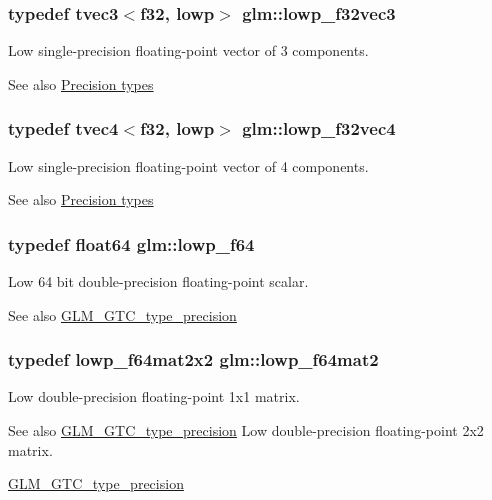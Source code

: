 \subsubsection[{lowp\+\_\+f32vec3}]{\setlength{\rightskip}{0pt plus 5cm}typedef tvec3$<${\bf f32}, lowp$>$ {\bf glm\+::lowp\+\_\+f32vec3}}\label{namespaceglm_a20fd0e645527d92ef2cc90fd9f381b77}
Low single-\/precision floating-\/point vector of 3 components. \begin{DoxySeeAlso}{See also}
\hyperlink{group__core__precision}{Precision types} 
\end{DoxySeeAlso}
\hypertarget{namespaceglm_a4195c4bf218285be96f8ea5dddbb76c0}{}
\subsubsection[{lowp\+\_\+f32vec4}]{\setlength{\rightskip}{0pt plus 5cm}typedef tvec4$<${\bf f32}, lowp$>$ {\bf glm\+::lowp\+\_\+f32vec4}}\label{namespaceglm_a4195c4bf218285be96f8ea5dddbb76c0}
Low single-\/precision floating-\/point vector of 4 components. \begin{DoxySeeAlso}{See also}
\hyperlink{group__core__precision}{Precision types} 
\end{DoxySeeAlso}
\hypertarget{namespaceglm_a59839f4bf6b97c93b0def577890bbfb8}{}
\subsubsection[{lowp\+\_\+f64}]{\setlength{\rightskip}{0pt plus 5cm}typedef {\bf float64} {\bf glm\+::lowp\+\_\+f64}}\label{namespaceglm_a59839f4bf6b97c93b0def577890bbfb8}
Low 64 bit double-\/precision floating-\/point scalar. \begin{DoxySeeAlso}{See also}
\hyperlink{group__gtc__type__precision}{G\+L\+M\+\_\+\+G\+T\+C\+\_\+type\+\_\+precision} 
\end{DoxySeeAlso}
\hypertarget{namespaceglm_a2984b3b0b6ee0657044d186bb875b4e3}{}
\subsubsection[{lowp\+\_\+f64mat2}]{\setlength{\rightskip}{0pt plus 5cm}typedef {\bf lowp\+\_\+f64mat2x2} {\bf glm\+::lowp\+\_\+f64mat2}}\label{namespaceglm_a2984b3b0b6ee0657044d186bb875b4e3}
Low double-\/precision floating-\/point 1x1 matrix. \begin{DoxySeeAlso}{See also}
\hyperlink{group__gtc__type__precision}{G\+L\+M\+\_\+\+G\+T\+C\+\_\+type\+\_\+precision} Low double-\/precision floating-\/point 2x2 matrix. 

\hyperlink{group__gtc__type__precision}{G\+L\+M\+\_\+\+G\+T\+C\+\_\+type\+\_\+precision} 
\end{DoxySeeAlso}
\hypertarget{namespaceglm_aa0842065affce367ff31e0d9af433c3d}{}

